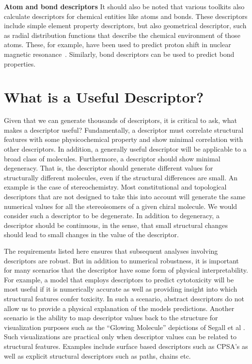 \documentclass[letterpaper, 12pt]{article}
\begin{document}
\textbf{Atom and bond descriptors} It should also be noted that various
toolkits also calculate descriptors for chemical entities like atoms and
bonds. These descriptors include simple element property descriptors,
but also geometrical descriptor, such as radial distribution functions
that describe the chemical environment of those atoms. These,
for example, have been used to predict proton shift in 
nuclear magnetic resonance~\cite{AiresDeSousa2002}. Similarly, bond
descriptors can be used to predict bond properties.

\section{What is a Useful Descriptor?}
\label{sec:what-usef-descr}

Given that we can generate thousands of descriptors,  it is critical to ask, what
makes a descriptor useful? Fundamentally, a descriptor must correlate
structural features with some physicochemical property and show
minimal correlation with other descriptors. In addition, a generally
useful descriptor will be applicable to a broad class of
molecules. Furthermore, a descriptor should show minimal
degeneracy. That is, the descriptor should generate different values
for structurally different molecules, even if the structural
differences are small. An example is the case of stereochemistry. Most
constitutional and topological descriptors that are not designed to take this into account will
generate the same numerical values for all the stereoisomers of a
given chiral molecule. We would consider such a descriptor to be
degenerate. In addition to degeneracy, a descriptor should be
continuous, in the sense, that small structural changes should lead to
small changes in the value of the descriptor.

The requirements listed here ensures that subsequent analyses
involving descriptors are robust. But in addition to numerical
robustness, it is important for many scenarios that the descriptor
have some form of physical interpretability.  For example, a model
that employs descriptors to predict cytotoxicity will be most useful if
it is numerically accurate as well as providing insight into which
structural features confer toxicity. In such a scenario, abstract
descriptors do not allow us to provide a physical explanation of the
models predictions. Another scenario is the ability to map descriptor
values back to the structure for visualization purposes such as the
``Glowing Molecule'' depictions of Segall et al
\cite{Segall:2009fk}. Such visualizations are practical only when
descriptor values can be related to structural features. Examples
include surface based descriptors such as CPSA's as well as explicit
structural descriptors such as paths, chains etc.
\end{document}
